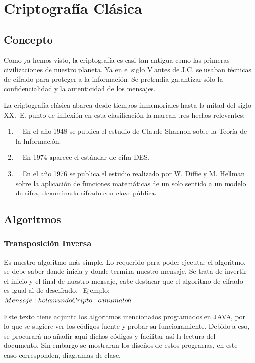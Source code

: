 \documentclass[11pt, conference]{IEEEtran}
\begin{document}
\section{Criptografía Clásica}
\subsection{Concepto}
Como ya hemos visto, la criptografía es casi tan antigua como las primeras civilizaciones de nuestro planeta. Ya en el siglo V antes de J.C. se usaban técnicas de cifrado para proteger a la información. Se pretendía garantizar sólo la confidencialidad y la autenticidad de los mensajes.

La criptografía clásica abarca desde tiempos inmemoriales hasta la mitad del siglo XX. El punto de inflexión en esta clasificación la marcan tres hechos relevantes:
	\begin{enumerate}
		\item  En el año 1948 se publica el estudio de Claude Shannon sobre la Teoría de la Información.
		\item  En 1974 aparece el estándar de cifra DES.
		\item  En el año 1976 se publica el estudio realizado por W. Diffie y M. Hellman sobre la aplicación de funciones matemáticas de un solo sentido a un modelo de cifra, denominado cifrado con clave pública.
	\end{enumerate}
\subsection{Algoritmos} 
\subsubsection{Transposición Inversa}
Es nuestro algoritmo más simple. Lo requerido para poder ejecutar el algoritmo, se debe saber donde inicia y donde termina nuestro mensaje. Se trata de invertir el inicio y el final de nuestro mensaje, cabe destacar que el algoritmo de cifrado es igual al de descifrado. 
\
Ejemplo: 
\\
$
Mensaje: hola mundo\\ 
Cripto: odnumaloh \\
$


Este texto tiene adjunto los algoritmos mencionados programados en JAVA, por lo que se sugiere ver los códigos fuente y probar su funcionamiento. Debido a eso, se procurará no añadir aquí dichos códigos y facilitar así la lectura del documento. Sin embargo se mostraran los diseños de estos programas, en este caso corresponden, diagramas de clase. 
\end{document}
